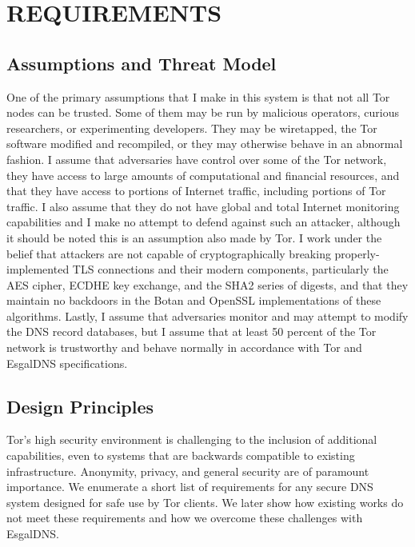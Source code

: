 
\chapter{\uppercase{Requirements}}

\section{Assumptions and Threat Model}

One of the primary assumptions that I make in this system is that not all Tor nodes can be trusted. Some of them may be run by malicious operators, curious researchers, or experimenting developers. They may be wiretapped, the Tor software modified and recompiled, or they may otherwise behave in an abnormal fashion. I assume that adversaries have control over some of the Tor network, they have access to large amounts of computational and financial resources, and that they have access to portions of Internet traffic, including portions of Tor traffic. I also assume that they do not have global and total Internet monitoring capabilities and I make no attempt to defend against such an attacker, although it should be noted this is an assumption also made by Tor. I work under the belief that attackers are not capable of cryptographically breaking properly-implemented TLS connections and their modern components, particularly the AES cipher, ECDHE key exchange, and the SHA2 series of digests, and that they maintain no backdoors in the Botan and OpenSSL implementations of these algorithms. Lastly, I assume that adversaries monitor and may attempt to modify the DNS record databases, but I assume that at least 50 percent of the Tor network is trustworthy and behave normally in accordance with Tor and EsgalDNS specifications.

\section{Design Principles}

Tor's high security environment is challenging to the inclusion of additional capabilities, even to systems that are backwards compatible to existing infrastructure. Anonymity, privacy, and general security are of paramount importance. We enumerate a short list of requirements for any secure DNS system designed for safe use by Tor clients. We later show how existing works do not meet these requirements and how we overcome these challenges with EsgalDNS.

